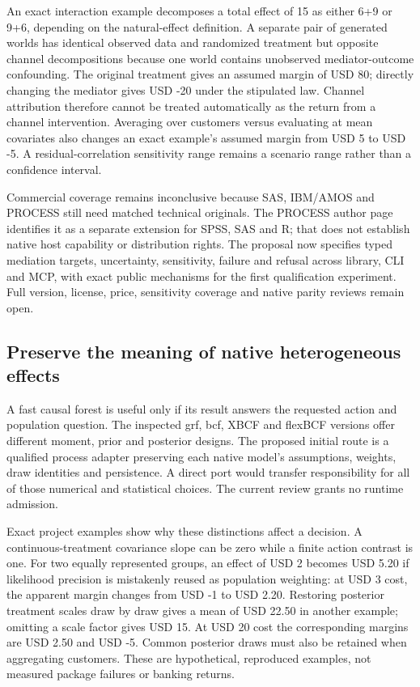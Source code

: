 An exact interaction example decomposes a total effect of 15 as either
6+9 or 9+6, depending on the natural-effect definition. A separate pair
of generated worlds has identical observed data and randomized treatment
but opposite channel decompositions because one world contains
unobserved mediator-outcome confounding. The original treatment gives an
assumed margin of USD 80; directly changing the mediator gives USD -20
under the stipulated law. Channel attribution therefore cannot be
treated automatically as the return from a channel intervention.
Averaging over customers versus evaluating at mean covariates also
changes an exact example's assumed margin from USD 5 to USD -5. A
residual-correlation sensitivity range remains a scenario range rather
than a confidence interval.\citep{exec20_med_reference}

Commercial coverage remains inconclusive because SAS, IBM/AMOS and
PROCESS still need matched technical originals. The PROCESS author page
identifies it as a separate extension for SPSS, SAS and R; that does not
establish native host capability or distribution rights. The proposal
now specifies typed mediation targets, uncertainty, sensitivity, failure
and refusal across library, CLI and MCP, with exact public mechanisms
for the first qualification experiment. Full version, license, price,
sensitivity coverage and native parity reviews remain
open.\citep{exec20_med_process_lead}

\hypertarget{preserve-the-meaning-of-native-heterogeneous-effects}{%
\subsection{Preserve the meaning of native heterogeneous
effects}\label{preserve-the-meaning-of-native-heterogeneous-effects}}

A fast causal forest is useful only if its result answers the requested
action and population question. The inspected grf, bcf, XBCF and flexBCF
versions offer different moment, prior and posterior designs. The
proposed initial route is a qualified process adapter preserving each
native model's assumptions, weights, draw identities and persistence. A
direct port would transfer responsibility for all of those numerical and
statistical choices. The current review grants no runtime admission.
\citep{exec21_cxx_grf,exec21_cxx_bcf,exec21_cxx_xbcf,exec21_cxx_flexbcf}

Exact project examples show why these distinctions affect a decision. A
continuous-treatment covariance slope can be zero while a finite action
contrast is one. For two equally represented groups, an effect of USD 2
becomes USD 5.20 if likelihood precision is mistakenly reused as
population weighting: at USD 3 cost, the apparent margin changes from
USD -1 to USD 2.20. Restoring posterior treatment scales draw by draw
gives a mean of USD 22.50 in another example; omitting a scale factor
gives USD 15. At USD 20 cost the corresponding margins are USD 2.50 and
USD -5. Common posterior draws must also be retained when aggregating
customers. These are hypothetical, reproduced examples, not measured
package failures or banking returns. \citep{exec21_cxx_reference}

